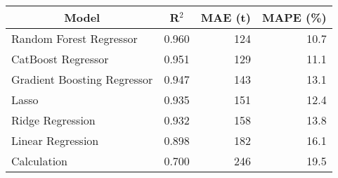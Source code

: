 
\begin{tabular}[t]{lrrr}
\toprule
\multicolumn{1}{c}{Model} & \multicolumn{1}{c}{R$^2$} & \multicolumn{1}{c}{MAE (t)} & \multicolumn{1}{c}{MAPE (\%)}\\
\midrule
Random Forest Regressor & 0.960 & 124 & 10.7\\
CatBoost Regressor & 0.951 & 129 & 11.1\\
Gradient Boosting Regressor & 0.947 & 143 & 13.1\\
Lasso & 0.935 & 151 & 12.4\\
Ridge Regression & 0.932 & 158 & 13.8\\
Linear Regression & 0.898 & 182 & 16.1\\
Calculation & 0.700 & 246 & 19.5\\
\bottomrule
\end{tabular}
